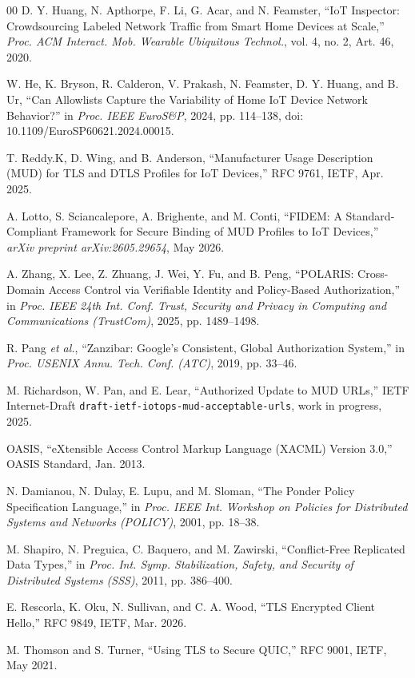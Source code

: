 \documentclass[journal]{IEEEtran}
\theoremstyle{definition}
\begin{document}
\begin{thebibliography}{00}
 D. Y. Huang, N. Apthorpe, F. Li, G. Acar, and N. Feamster,
``IoT Inspector: Crowdsourcing Labeled Network Traffic from Smart Home Devices at
Scale,'' \emph{Proc. ACM Interact. Mob. Wearable Ubiquitous Technol.}, vol. 4,
no. 2, Art. 46, 2020.

 W. He, K. Bryson, R. Calderon, V. Prakash,
N. Feamster, D. Y. Huang, and B. Ur, ``Can Allowlists Capture the Variability
of Home IoT Device Network Behavior?'' in \emph{Proc. IEEE EuroS\&P}, 2024,
pp. 114--138, doi: 10.1109/EuroSP60621.2024.00015.

 T. Reddy.K, D. Wing, and B. Anderson, ``Manufacturer Usage Description
(MUD) for TLS and DTLS Profiles for IoT Devices,'' RFC 9761, IETF, Apr. 2025.

 A. Lotto, S. Sciancalepore, A. Brighente, and M. Conti, ``FIDEM: A
Standard-Compliant Framework for Secure Binding of MUD Profiles to IoT Devices,''
\emph{arXiv preprint arXiv:2605.29654}, May 2026.

 A. Zhang, X. Lee, Z. Zhuang, J. Wei, Y. Fu, and B. Peng, ``POLARIS:
Cross-Domain Access Control via Verifiable Identity and Policy-Based Authorization,''
in \emph{Proc. IEEE 24th Int. Conf. Trust, Security and Privacy in Computing and
Communications (TrustCom)}, 2025, pp. 1489--1498.

 R. Pang \emph{et al.}, ``Zanzibar: Google's Consistent, Global
Authorization System,'' in \emph{Proc. USENIX Annu. Tech. Conf. (ATC)}, 2019,
pp. 33--46.

 M. Richardson, W. Pan, and E. Lear, ``Authorized
Update to MUD URLs,'' IETF Internet-Draft
\texttt{draft-ietf-iotops-mud-acceptable-urls}, work in progress, 2025.

 OASIS, ``eXtensible Access Control Markup Language (XACML)
Version 3.0,'' OASIS Standard, Jan. 2013.

 N. Damianou, N. Dulay, E. Lupu, and M. Sloman, ``The Ponder
Policy Specification Language,'' in \emph{Proc. IEEE Int. Workshop on Policies
for Distributed Systems and Networks (POLICY)}, 2001, pp. 18--38.

 M. Shapiro, N. Preguica, C. Baquero, and M. Zawirski,
``Conflict-Free Replicated Data Types,'' in \emph{Proc. Int. Symp. Stabilization,
Safety, and Security of Distributed Systems (SSS)}, 2011, pp. 386--400.

 E. Rescorla, K. Oku, N. Sullivan, and C. A. Wood,
``TLS Encrypted Client Hello,'' RFC 9849, IETF, Mar. 2026.

 M. Thomson and S. Turner, ``Using TLS to Secure QUIC,''
RFC 9001, IETF, May 2021.

\end{thebibliography}
\end{document}
